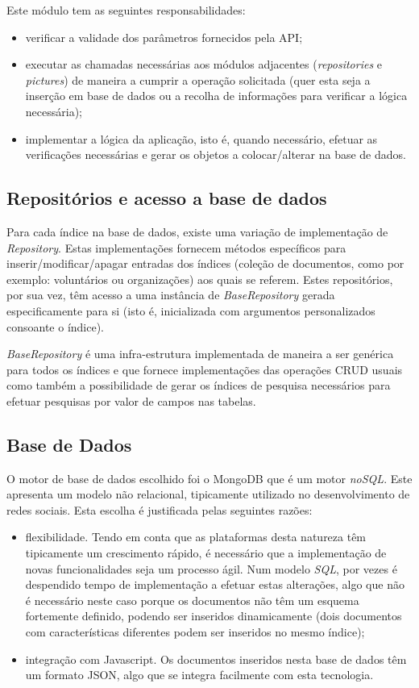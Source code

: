 Este módulo tem as seguintes responsabilidades:
\begin{itemize}
	\item verificar a validade dos parâmetros fornecidos pela API;
	\item executar as chamadas necessárias aos módulos adjacentes (\textit{repositories} e \textit{pictures}) de maneira a cumprir a operação solicitada (quer esta seja a inserção em base de dados ou a recolha de informações para verificar a lógica necessária);
	\item implementar a lógica da aplicação, isto é, quando necessário, efetuar as verificações necessárias e gerar os objetos a colocar/alterar na base de dados.
\end{itemize}

\subsection{Repositórios e acesso a base de dados}
Para cada índice na base de dados, existe uma variação de implementação de \textit{Repository}. Estas implementações fornecem métodos específicos para inserir/modificar/apagar entradas dos índices (coleção de documentos, como por exemplo: voluntários ou organizações) aos quais se referem. Estes repositórios, por sua vez, têm acesso a uma instância de \textit{BaseRepository} gerada especificamente para si (isto é, inicializada com argumentos personalizados consoante o índice). \par \medskip

\textit{BaseRepository} é uma infra-estrutura implementada de maneira a ser genérica para todos os índices e que fornece implementações das operações CRUD usuais como também a possibilidade de gerar os índices de pesquisa necessários para efetuar pesquisas por valor de campos nas tabelas. \par \medskip

\subsection{Base de Dados}
O motor de base de dados escolhido foi o MongoDB que é um motor \textit{noSQL}. Este apresenta um modelo não relacional, tipicamente utilizado no desenvolvimento de redes sociais. Esta escolha é justificada pelas seguintes razões:

\begin{itemize}
	\item flexibilidade. Tendo em conta que as plataformas desta natureza têm tipicamente um crescimento rápido, é necessário que a implementação de novas funcionalidades seja um processo ágil. Num modelo \textit{SQL}, por vezes é despendido tempo de implementação a efetuar estas alterações, algo que não é necessário neste caso porque os documentos não têm um esquema fortemente definido, podendo ser inseridos dinamicamente (dois documentos com características diferentes podem ser inseridos no mesmo índice);
	\item integração com Javascript. Os documentos inseridos nesta base de dados têm um formato JSON, algo que se integra facilmente com esta tecnologia.
\end{itemize} 

